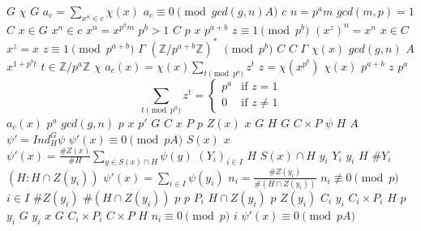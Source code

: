 \documentclass{article}
\begin{document}
$G$
$\chi$
$G$
$a_{c}=\sum_{x^{n}\in c}\chi(x)$
$a_{c}\equiv0\pmod{gcd(g,n)A}$
$c$
$n=p^{a}m$
$gcd(m,p)=1$
$C$
$x \in G$
$x^{n}\in c$
$x^{n}=x^{p^{a}m}$
$p^{b}>1$
$C$
$p$
$x$
$p^{a+b}$
$z\equiv1\pmod{p^{b}}$
$(x^{z})^{n}=x^{n}$
$x \in C$
$x^{z}=x$
$z\equiv1\pmod{p^{a+b}}$
$\Gamma$
$(\mathbb{Z} / p^{a+b}\mathbb{Z})^{*}$
$\pmod{p^{b}}$
$C$
$C$
$\Gamma$
$\chi(x)$
$gcd(g,n)$
$A$
$x^{1+p^{b}t}$
$t\in \mathbb{Z} / p^{a}\mathbb{Z}$
$\chi$
$a_{c}(x)=\chi(x)\sum_{t\pmod{p^{a}}}z^{t}$
$z=\chi(x^{p^{b}})$
$\chi(x)$
$p^{a+b}$
$z$
$p^{a}$
$$
\sum_{t\pmod{p^{a}}}z^{t}=\begin{cases}p^{a}&\text{if } z=1 \\
0&\text{if } z\neq1\end{cases}
$$
$a_{c}(x)$
$p^{a}$
$gcd(g,n)$
$p$
$x$
$p'$
$G$
$C$
$x$
$P$
$p$
$Z(x)$
$x$
$G$
$H$
$G$
$C\times P$
$\psi$
$H$
$A$
$\psi'=Ind_{H}^{G}\psi$
$\psi'(x)\equiv0\pmod{pA}$
$S(x)$
$x$
$\psi'(x)=\frac{\#Z(x)}{\#H}\sum_{y \in S(x)\cap H}\psi(y)$
$(Y_{i})_{i\in I}$
$H$
$S(x)\cap H$
$y_{i}$
$Y_{i}$
$y_{i}$
$H$
$\#Y_{i}$
$(H:H\cap Z(y_{i}))$
$\psi'(x)=\sum_{i\in I}\psi(y_{i})$
$n_{i}=\frac{\#Z(y_{i})}{\#(H\cap Z(y_{i}))}$
$n_{i}\not\equiv0\pmod{p}$
$i\in I$
$\#Z(y_{i})$
$\#(H\cap Z(y_{i}))$
$p$
$p$
$P_{i}$
$H\cap Z(y_{i})$
$p$
$Z(y_{i})$
$C_{i}$
$y_{i}$
$C_{i}\times P_{i}$
$H$
$p$
$y_{i}$
$G$
$y_{i}$
$x$
$G$
$C_{i}\times P_{i}$
$C\times P$
$H$
$n_{i}\equiv0\pmod{p}$
$i$
$\psi'(x)\equiv0\pmod{pA}$
\end{document}
